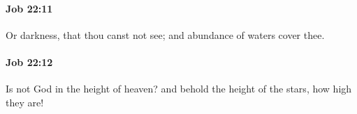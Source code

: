 		\paragraph{Job 22:11} %
			\label{JOB-22-11}

			Or darkness, that thou canst not see; and abundance of waters cover thee.


		\paragraph{Job 22:12} %
			\label{JOB-22-12}

			Is not God in the height of heaven? and behold the height of the stars, how high they are!


